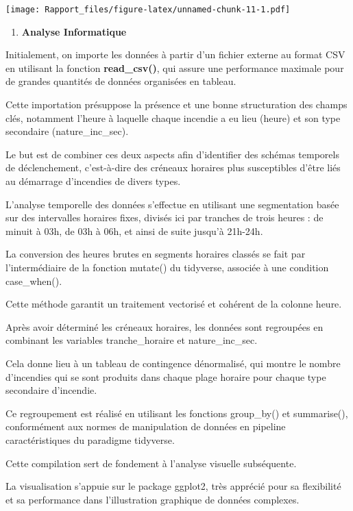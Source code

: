 \documentclass[
]{article}
\providecommand{\tightlist}{%
  \setlength{\itemsep}{0pt}\setlength{\parskip}{0pt}}
\begin{document}
\texttt{[image: Rapport\_files/figure-latex/unnamed-chunk-11-1.pdf]}

\begin{enumerate}
\def\labelenumi{\arabic{enumi}.}
\tightlist
\item
  \textbf{Analyse Informatique}
\end{enumerate}

Initialement, on importe les données à partir d'un fichier externe au
format CSV en utilisant la fonction \textbf{read\_csv()}, qui assure une
performance maximale pour de grandes quantités de données organisées en
tableau.

Cette importation présuppose la présence et une bonne structuration des
champs clés, notamment l'heure à laquelle chaque incendie a eu lieu
(heure) et son type secondaire (nature\_inc\_sec).

Le but est de combiner ces deux aspects afin d'identifier des schémas
temporels de déclenchement, c'est-à-dire des créneaux horaires plus
susceptibles d'être liés au démarrage d'incendies de divers types.

L'analyse temporelle des données s'effectue en utilisant une
segmentation basée sur des intervalles horaires fixes, divisés ici par
tranches de trois heures : de minuit à 03h, de 03h à 06h, et ainsi de
suite jusqu'à 21h-24h.

La conversion des heures brutes en segments horaires classés se fait par
l'intermédiaire de la fonction mutate() du tidyverse, associée à une
condition case\_when().

Cette méthode garantit un traitement vectorisé et cohérent de la colonne
heure.

Après avoir déterminé les créneaux horaires, les données sont regroupées
en combinant les variables tranche\_horaire et nature\_inc\_sec.~

Cela donne lieu à un tableau de contingence dénormalisé, qui montre le
nombre d'incendies qui se sont produits dans chaque plage horaire pour
chaque type secondaire d'incendie.

Ce regroupement est réalisé en utilisant les fonctions group\_by() et
summarise(), conformément aux normes de manipulation de données en
pipeline caractéristiques du paradigme tidyverse.

Cette compilation sert de fondement à l'analyse visuelle subséquente.

La visualisation s'appuie sur le package ggplot2, très apprécié pour sa
flexibilité et sa performance dans l'illustration graphique de données
complexes.
\end{document}
